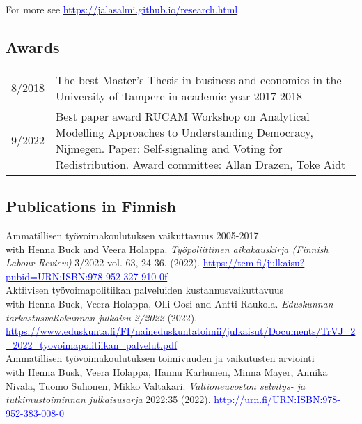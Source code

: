 \documentclass[16pt]{article}
\begin{document}
\noindent For more see \href{https://jalasalmi.github.io/research.html}{\textcolor{blue}{https://jalasalmi.github.io/research.html}}

\subsection*{Awards} 
\begin{tabular}{@{}p{1.5in}p{5in}}
8/2018           & The best Master's Thesis in business and economics in the University of Tampere in academic year 2017-2018 \\
9/2022           & Best paper award RUCAM Workshop on Analytical Modelling Approaches to Understanding Democracy, Nijmegen. Paper: Self-signaling and Voting for Redistribution. Award committee: Allan Drazen, Toke Aidt
\end{tabular}

\newpage
\subsection*{Publications in Finnish}

\noindent Ammatillisen työvoimakoulutuksen vaikuttavuus 2005-2017 \\
\noindent  with Henna Buck and Veera Holappa. \textit{Työpoliittinen aikakauskirja (Finnish Labour Review)} 3/2022 vol. 63, 24-36.  (2022). \href{https://tem.fi/julkaisu?pubid=URN:ISBN:978-952-327-910-0}{\textcolor{blue}{https://tem.fi/julkaisu?pubid=URN:ISBN:978-952-327-910-0f}} \\

\noindent Aktiivisen työvoimapolitiikan palveluiden kustannusvaikuttavuus \\
\noindent with Henna Buck, Veera Holappa, Olli Oosi and Antti Raukola. \textit{Eduskunnan tarkastusvaliokunnan julkaisu 2/2022} (2022). \href{https://www.eduskunta.fi/FI/naineduskuntatoimii/julkaisut/Documents/TrVJ\_2\_2022\_tyovoimapolitiikan\_palvelut.pdf}{\textcolor{blue}{https://www.eduskunta.fi/FI/naineduskuntatoimii/julkaisut/Documents/TrVJ\_2\_2022\_tyovoimapolitiikan\_palvelut.pdf}} \\

\noindent Ammatillisen ty\"{o}voimakoulutuksen toimivuuden ja vaikutusten arviointi \\
\noindent with Henna Busk, Veera Holappa, Hannu Karhunen, Minna Mayer, Annika Nivala, Tuomo Suhonen, Mikko Valtakari.  \textit{Valtioneuvoston selvitys- ja tutkimustoiminnan julkaisusarja} 2022:35 (2022). \href{http://urn.fi/URN:ISBN:978-952-383-008-0}{\textcolor{blue}{http://urn.fi/URN:ISBN:978-952-383-008-0}} \\
\end{document}
